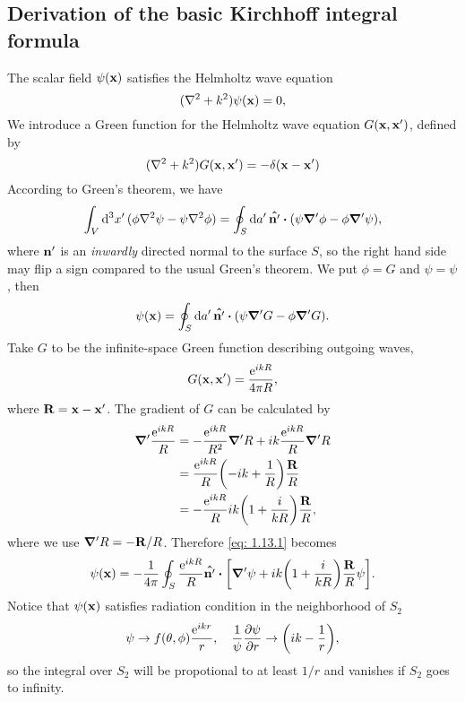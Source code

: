 \documentclass[10pt]{article}
\begin{document}
\subsection{Derivation of the basic Kirchhoff integral formula}
The scalar field $\psi(\vb{x})$ satisfies the Helmholtz wave equation
\begin{equation}
	(\laplacian + k^2) \psi(\vb{x}) = 0,
\end{equation}
We introduce a Green function for the Helmholtz wave equation $G(\vb{x}, \vb{x'})$, defined by
\begin{equation}
	(\laplacian + k^2) G(\vb{x}, \vb{x'}) = - \delta(\vb{x}-\vb{x'})
\end{equation}
According to Green's theorem, we have
\begin{equation}
	\int_V \dd[3]{x'} (\phi \laplacian \psi - \psi \laplacian \phi) = \oint_S \dd{a'} \vu{n'} \vdot (\psi \grad'{\phi} - \phi \grad'{\psi}),
\end{equation}
where $\vb{n'}$ is an \textit{inwardly} directed normal to the surface $S$, so the right hand side may flip a sign compared to the usual Green's theorem. We put $\phi = G$ and $\psi = \psi$, then
\begin{equation}
	\psi(\vb{x}) = \oint_S \dd{a'} \vu{n'} \vdot (\psi \grad'{G} - \phi \grad'{G}). \label{eq: 1.13.1}
\end{equation}
Take $G$ to be the infinite-space Green function describing outgoing waves,
\begin{equation}
	G(\vb{x}, \vb{x'}) = \frac{{\mathrm{e}}^{ikR}}{4\pi R},
\end{equation}
where $\vb{R} = \vb{x} - \vb{x'}$. The gradient of $G$ can be calculated by
\begin{align*}
	\grad'{\frac{{\mathrm{e}}^{ikR}}{R}} &= -\frac{{\mathrm{e}}^{ikR}}{R^2} \grad'{R} + ik\frac{{\mathrm{e}}^{ikR}}{R} \grad'{R} \\
	&= \frac{{\mathrm{e}}^{ikR}}{R}\qty(-ik + \frac{1}{R}) \frac{\vb{R}}{R} \\
	&= - \frac{{\mathrm{e}}^{ikR}}{R}ik\qty(1 + \frac{i}{kR}) \frac{\vb{R}}{R},
\end{align*}
where we use $\grad'{R} = -\vb{R}/R$. Therefore \eqref{eq: 1.13.1} becomes
\begin{equation}
	\psi(\vb{x}) = -\frac{1}{4\pi} \oint_S \frac{\e^{ikR}}{R} \vu{n'} \vdot \qty[\grad'{\psi} + ik \qty(1 + \frac{i}{kR}) \frac{\vb{R}}{R} \psi].
\end{equation}
Notice that $\psi(\vb{x})$ satisfies radiation condition in the neighborhood of $S_2$
\begin{equation}
	\psi \to f(\theta, \phi) \frac{\e^{ikr}}{r}\qc \frac{1}{\psi} \pdv{\psi}{r} \to \qty(ik - \frac{1}{r}),
\end{equation}
so the integral over $S_2$ will be propotional to at least $1/r$ and vanishes if $S_2$ goes to infinity.
\end{document}
